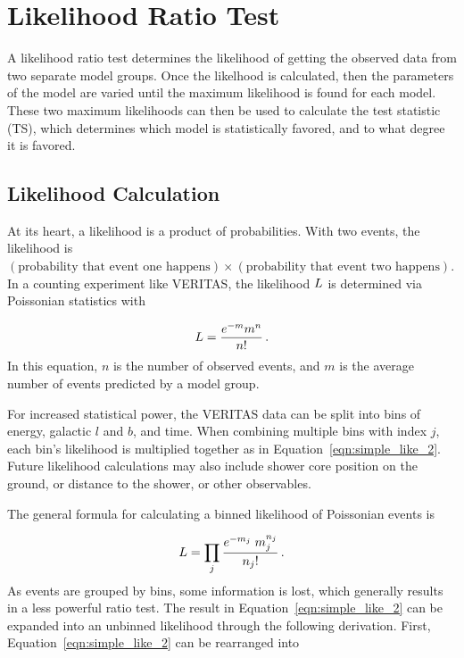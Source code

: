 \section{Likelihood Ratio Test}\label{sec:likeratio}
  A likelihood ratio test determines the likelihood of getting the observed data from two separate model groups.
  Once the likelhood is calculated, then the parameters of the model are varied until the maximum likelihood is found for each model.
  These two maximum likelihoods can then be used to calculate the test statistic (TS), which determines which model is statistically favored, and to what degree it is favored.
  
  \subsection{Likelihood Calculation}
  At its heart, a likelihood is a product of probabilities.
  With two events, the likelihood is $(\textrm{probability that event one happens})\times(\textrm{probability that event two happens})$.
  In a counting experiment like VERITAS, the likelihood $L$ is determined via Poissonian statistics with

  \begin{equation}\label{eqn:simple_like}
    L = \frac{e^{-m} m^n}{n!} \,.
  \end{equation}
  In this equation, $n$ is the number of observed events, and $m$ is the average number of events predicted by a model group.
  
  For increased statistical power, the VERITAS data can be split into bins of energy, galactic $l$ and $b$, and time.
  When combining multiple bins with index $j$, each bin's likelihood is multiplied together as in Equation~\ref{eqn:simple_like_2}.
  Future likelihood calculations may also include shower core position on the ground, or distance to the shower, or other observables.
  
  The general formula for calculating a binned likelihood of Poissonian events is
  
  \begin{equation}\label{eqn:simple_like_2}
    L = \prod_j \frac{ e^{-m_j} \; m_{j}^{n_j}}{n_{j}!} \,.
  \end{equation}
  As events are grouped by bins, some information is lost, which generally results in a less powerful ratio test.
  The result in Equation~\ref{eqn:simple_like_2} can be expanded into an unbinned likelihood through the following derivation.
  First, Equation~\ref{eqn:simple_like_2} can be rearranged into

